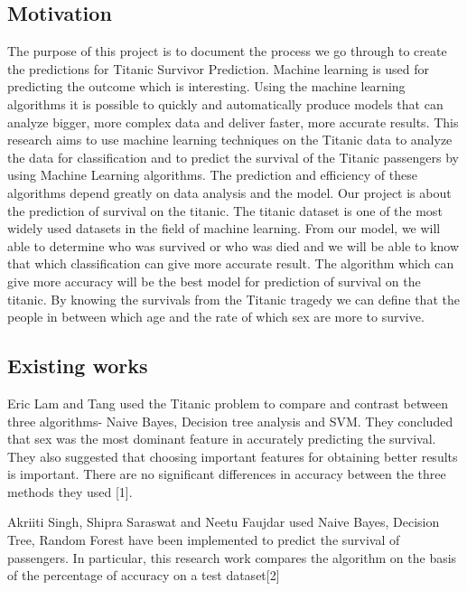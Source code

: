 \documentclass[11pt]{article} %
\begin{document}
\subsection{Motivation}
The purpose of this project is to document the process we go through to create the predictions for Titanic Survivor Prediction. Machine learning is used for predicting the outcome which is interesting.  Using the machine learning algorithms it is possible to quickly and automatically produce models that can analyze bigger, more complex data and deliver faster, more accurate results.
This research aims to use machine learning techniques on the Titanic data to analyze the data for classification and to predict the survival of the Titanic passengers by using Machine Learning algorithms. The prediction and efficiency of these algorithms depend greatly on data analysis and the model.
Our project is about the prediction of survival on the titanic. The titanic dataset is one of the most widely used datasets in the field of machine learning. From our model, we will able to determine who was survived or who was died and we will be able to know that which classification can give more accurate result.
The algorithm which can give more accuracy will be the best model for prediction of survival on the titanic. By knowing the survivals from the Titanic tragedy we can define that the people in between which age and the rate of which sex are more to survive.


\subsection{Existing works}
Eric Lam and Tang used the Titanic problem to compare and contrast between three algorithms- Naive Bayes, Decision tree analysis and SVM. They concluded that sex was the most dominant feature in accurately predicting the survival. They also suggested that choosing important features for obtaining better results is important. There are no significant differences in accuracy between the three methods they used [1]. 

Akriiti Singh, Shipra Saraswat and Neetu Faujdar used Naive Bayes, Decision Tree, Random Forest have been implemented to predict the survival of passengers. In particular, this research work compares the algorithm on the basis of the percentage of accuracy on a test dataset[2]
\end{document}

